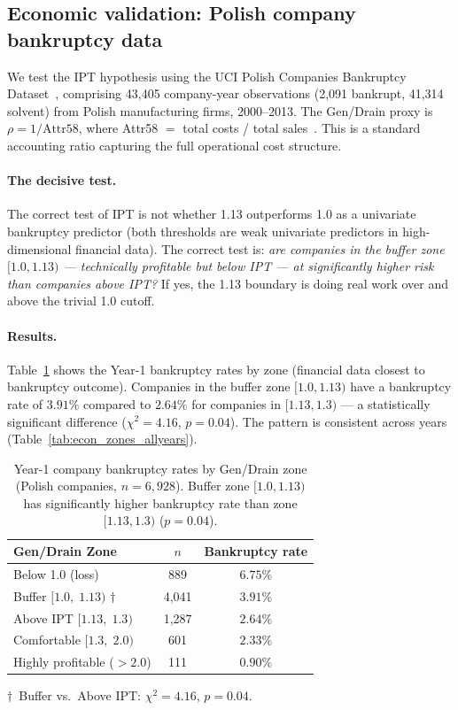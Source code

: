 \documentclass[11pt,twocolumn]{article}
\theoremstyle{remark}
\begin{document}
\subsection{Economic validation: Polish company bankruptcy data}
\label{sec:realworld:econ}

We test the IPT hypothesis using the UCI Polish Companies Bankruptcy Dataset~\cite{ZiebaPolish2016}, comprising 43,405 company-year observations (2,091 bankrupt, 41,314 solvent) from Polish manufacturing firms, 2000--2013. The Gen/Drain proxy is $\rho = 1/\text{Attr58}$, where Attr58 $=$ total costs / total sales~\cite{ucirepository}. This is a standard accounting ratio capturing the full operational cost structure.

\paragraph{The decisive test.}
The correct test of IPT is not whether 1.13 outperforms 1.0 as a univariate bankruptcy predictor (both thresholds are weak univariate predictors in high-dimensional financial data). The correct test is: \emph{are companies in the buffer zone $[1.0, 1.13)$ --- technically profitable but below IPT --- at significantly higher risk than companies above IPT?} If yes, the 1.13 boundary is doing real work over and above the trivial 1.0 cutoff.

\paragraph{Results.}
Table~\ref{tab:econ_zones} shows the Year-1 bankruptcy rates by zone (financial data closest to bankruptcy outcome). Companies in the buffer zone $[1.0, 1.13)$ have a bankruptcy rate of $3.91\%$ compared to $2.64\%$ for companies in $[1.13, 1.3)$ --- a statistically significant difference ($\chi^2 = 4.16$, $p = 0.04$). The pattern is consistent across years (Table~\ref{tab:econ_zones_allyears}).

\begin{table}[ht]
\centering
\caption{Year-1 company bankruptcy rates by Gen/Drain zone (Polish companies, $n = 6{,}928$). Buffer zone $[1.0, 1.13)$ has significantly higher bankruptcy rate than zone $[1.13, 1.3)$ ($p = 0.04$).}
\label{tab:econ_zones}
\begin{tabular}{@{}lcc@{}}
\toprule
Gen/Drain Zone & $n$ & Bankruptcy rate \\
\midrule
Below 1.0 (loss)             & 889  & $6.75\%$ \\
Buffer $[1.0,\;1.13)$ $\dagger$ & 4{,}041 & $3.91\%$ \\
Above IPT $[1.13,\;1.3)$     & 1{,}287 & $2.64\%$ \\
Comfortable $[1.3,\;2.0)$    &   601 & $2.33\%$ \\
Highly profitable ($>2.0$)   &   111 & $0.90\%$ \\
\bottomrule
\end{tabular}
{\small $\dagger$~Buffer vs.\ Above IPT: $\chi^2 = 4.16$, $p = 0.04$.}
\end{table}
\end{document}
